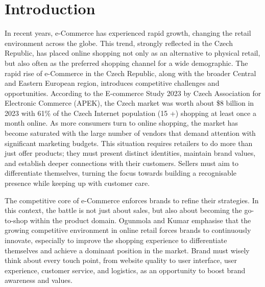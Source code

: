 \chapter*{Introduction}
\label{chap:introduction}
In recent years, e-Commerce has experienced rapid growth, changing the retail environment across the globe.
This trend, strongly reflected in the Czech Republic, has placed online shopping not only as an alternative to physical retail, but also often as the preferred shopping channel for a wide demographic.
The rapid rise of e-Commerce in the Czech Republic, along with the broader Central and Eastern European region, introduces competitive challenges and opportunities.
According to the \cite{ApekEcommerceStudy2023} E-commerce Study 2023 by Czech Association for Electronic Commerce (\ac{APEK}), the Czech market was worth about \$8 billion in 2023 with 61\% of the Czech Internet population (15 +) shopping at least once a month online.
As more consumers turn to online shopping, the market has become saturated with the large number of vendors that demand attention with significant marketing budgets.
This situation requires retailers to do more than just offer products; they must present distinct identities, maintain brand values, and establish deeper connections with their customers.
Sellers must aim to differentiate themselves, turning the focus towards building a recognisable presence while keeping up with customer care. 

The competitive core of e-Commerce enforces brands to refine their strategies. In this context, the battle is not just about sales, but also about becoming the go-to-shop within the product domain. 
Ogunmola and Kumar \cite{ecommerce-research-models} emphasise that the growing competitive environment in online retail forces brands to continuously innovate, especially to improve the shopping experience to differentiate themselves and achieve a dominant position in the market.
Brand must wisely think about every touch point, from website quality to user interface, user experience, customer service, and logistics, as an opportunity to boost brand awareness and values.

